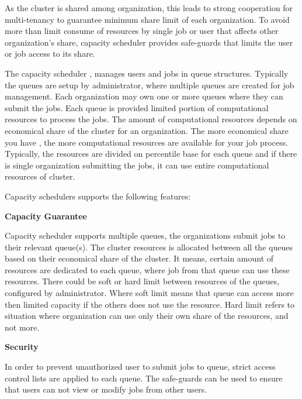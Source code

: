  As the cluster is shared among organization, this leads to strong cooperation for multi-tenancy to guarantee minimum share limit of each organization. To avoid more than limit consume of resources  by single job or user that affects other organization's share, capacity scheduler provides safe-guards that limits the user or job access to its share.\
 
  The capacity scheduler , manages users and jobs in queue structures. Typically the queues are setup by administrator, where multiple queues are created for job management. Each organization may own one or more queues where they can submit the jobs. Each queue is provided limited portion of computational resources to process the jobs. The amount of computational resources depends on economical share of the cluster for an organization. The more economical share you have , the more computational resources are available for your job process.  Typically, the resources are divided on percentile base for each queue and if there is single organization submitting the jobs, it can use entire computational resources of cluster. 
 
 
 Capacity schedulers supports the following features:
 

 

 \textbf{Capacity Guarantee}

Capacity scheduler supports multiple queues, the organizations submit jobs to their relevant queue(s). The cluster resources is allocated between all the queues based on their economical share of the cluster. It means, certain amount of resources are dedicated to each queue, where job from that queue can use these resources. There could be soft or hard limit between resources of the queues, configured by administrator. Where soft limit means that queue can access more then limited capacity if the others does not use the resource. Hard limit refers to situation where organization can use only their own share of the resources, and not more. 


 
 \textbf{Security}
 
In order to prevent unauthorized user to submit jobs to queue, strict access control lists are applied to each queue. The safe-guards can be used to ensure that users can not view or modify jobs from other users.   
 

